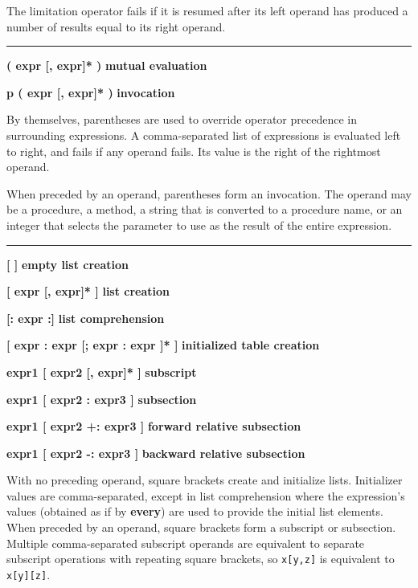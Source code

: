 \noindent
The limitation operator fails if it
is resumed after its left operand has produced a number of results
equal to its right operand.

\bigskip\hrule\vspace{0.1cm}
\noindent
{\bf ( expr [, expr]* ) } \hfill {\bf mutual evaluation}

\noindent
{\bf p ( expr [, expr]* ) } \hfill {\bf invocation}

\noindent
By themselves, parentheses are used
to override operator precedence in surrounding expressions. A
comma-separated list of expressions is evaluated left to right, and
fails if any operand fails. Its value is the right of the rightmost
operand.

When preceded by an operand, parentheses form an
invocation. The operand may be a procedure,
a method, a string that is converted to a procedure name, or an integer
that selects the parameter to use as the result of the entire expression.

\bigskip\hrule\vspace{0.1cm}

\noindent
{\bf \textbf{[} \textbf{]} } \hfill {\bf empty list creation}

\noindent
{\bf \textbf{[} expr [, expr]* \textbf{]} } \hfill {\bf list creation}

\noindent
{\bf \textbf{[:} expr \textbf{:]} } \hfill {\bf list comprehension}

\noindent
{\bf \textbf{[} expr : expr [; expr : expr ]* \textbf{]} } \hfill {\bf
initialized table creation}

\noindent
{\bf expr1 \textbf{[} expr2 [, expr]* \textbf{]} } \hfill {\bf subscript}

\noindent
{\bf expr1 \textbf{[} expr2 : expr3 \textbf{]} } \hfill {\bf subsection}\WarningNotThreadSafe
{}

\noindent
{\bf expr1 \textbf{[} expr2 +: expr3 \textbf{]} } \hfill {\bf forward relative subsection}

\noindent
{\bf expr1 \textbf{[} expr2 -: expr3 \textbf{]} } \hfill {\bf backward relative subsection}

\noindent
With no preceding operand, square brackets create and initialize lists.
Initializer values are comma-separated, except in list comprehension
where the expression's values (obtained as if by \textbf{every}) are used
to provide the initial list elements.
When preceded by an operand, square brackets form a subscript or
subsection. Multiple comma-separated subscript operands are equivalent
to separate subscript operations with repeating square brackets, so
\texttt{x[y,z]} is equivalent to \texttt{x[y][z]}.

